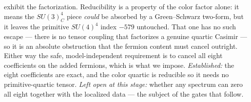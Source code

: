 \documentclass[11pt,a4paper]{article}
\begin{document}
exhibit the factorization. Reducibility is a property of the color factor alone: it
means the $SU(3)_C^4$ piece \emph{could} be absorbed by a Green--Schwarz two-form, but
it leaves the primitive $SU(4)^4$ index $-579$ untouched. That one has no such escape ---
there is no tensor coupling that factorizes a genuine quartic Casimir --- so it is an
absolute obstruction that the fermion content must cancel outright. Either way the safe, model-independent requirement is to
cancel all eight coefficients on the added fermions, which is what we impose.
\emph{Established:} the eight coefficients are exact, and the color quartic is reducible
so it needs no primitive-quartic tensor. \emph{Left open at this stage:} whether any
spectrum can zero all eight together with the localized data --- the subject of the
gates that follow.

\end{document}
